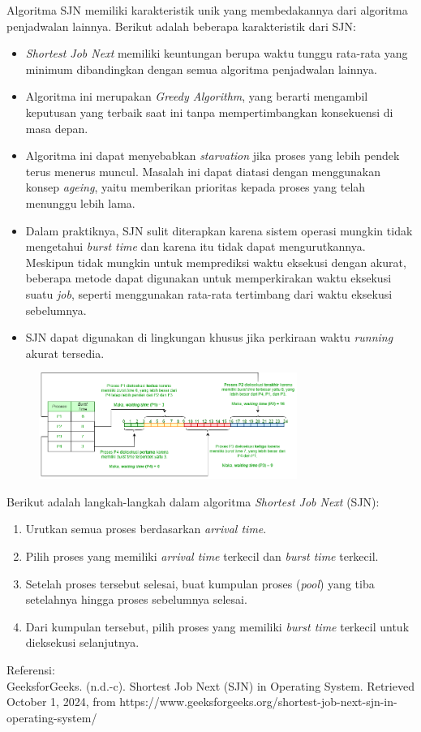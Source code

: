 \documentclass[12pt]{article}
\begin{document}
    Algoritma SJN memiliki karakteristik unik yang membedakannya dari algoritma penjadwalan lainnya. Berikut adalah beberapa karakteristik dari SJN:
    \begin{itemize}
        \item \textit{Shortest Job Next} memiliki keuntungan berupa waktu tunggu rata-rata yang minimum dibandingkan dengan semua algoritma penjadwalan lainnya.
        \item Algoritma ini merupakan \textit{Greedy Algorithm}, yang berarti mengambil keputusan yang terbaik saat ini tanpa mempertimbangkan konsekuensi di masa depan.
        \item Algoritma ini dapat menyebabkan \textit{starvation} jika proses yang lebih pendek terus menerus muncul. Masalah ini dapat diatasi dengan menggunakan konsep \textit{ageing}, yaitu memberikan prioritas kepada proses yang telah menunggu lebih lama.
        \item Dalam praktiknya, SJN sulit diterapkan karena sistem operasi mungkin tidak mengetahui \textit{burst time} dan karena itu tidak dapat mengurutkannya. Meskipun tidak mungkin untuk memprediksi waktu eksekusi dengan akurat, beberapa metode dapat digunakan untuk memperkirakan waktu eksekusi suatu \textit{job}, seperti menggunakan rata-rata tertimbang dari waktu eksekusi sebelumnya.
        \item SJN dapat digunakan di lingkungan khusus jika perkiraan waktu \textit{running} akurat tersedia.
    \end{itemize}
    \begin{figure}[h]
    \centering
    \includegraphics[width=0.75\textwidth]{assets/SJN 2.2.png}
    \label{fig:diagram}
    \end{figure}
    Berikut adalah langkah-langkah dalam algoritma \textit{Shortest Job Next} (SJN):
    \begin{enumerate} 
        \item Urutkan semua proses berdasarkan \textit{arrival time}.
        \item Pilih proses yang memiliki \textit{arrival time} terkecil dan \textit{burst time} terkecil.
        \item Setelah proses tersebut selesai, buat kumpulan proses (\textit{pool}) yang tiba setelahnya hingga proses sebelumnya selesai.
        \item Dari kumpulan tersebut, pilih proses yang memiliki \textit{burst time} terkecil untuk dieksekusi selanjutnya.
    \end{enumerate}
    Referensi:\\
    GeeksforGeeks. (n.d.-c). Shortest Job Next (SJN) in Operating System. Retrieved October 1, 2024, from https://www.geeksforgeeks.org/shortest-job-next-sjn-in-operating-system/
\end{document}
